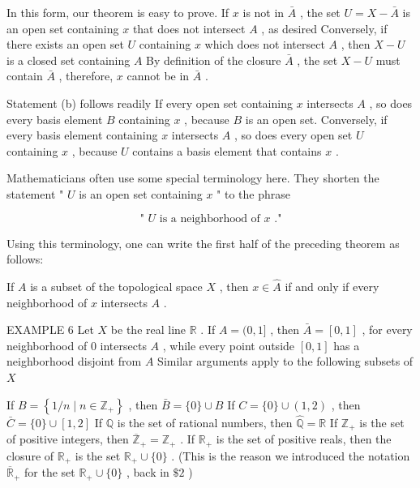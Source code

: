 In this form, our theorem is easy to prove. If \(x\) is not in \(\bar{A}\) , the set \(U = X - \bar{A}\) is an open set containing \(x\) that does not intersect \(A\) , as desired Conversely, if there exists an open set \(U\) containing \(x\) which does not intersect \(A\) , then \(X - U\) is a closed set containing \(A\) By definition of the closure \(\bar{A}\) , the set \(X - U\) must contain \(\bar{A}\) , therefore, \(x\) cannot be in \(\bar{A}\) .

Statement (b) follows readily If every open set containing \(x\) intersects \(A\) , so does every basis element \(B\) containing \(x\) , because \(B\) is an open set. Conversely, if every basis element containing \(x\) intersects \(A\) , so does every open set \(U\) containing \(x\) , because \(U\) contains a basis element that contains \(x\) .

Mathematicians often use some special terminology here. They shorten the statement " \(U\) is an open set containing \(x\) " to the phrase

\[
\text{ " }U\text{ is a neighborhood of }x\text{ ." }
\]

Using this terminology, one can write the first half of the preceding theorem as follows:

If \(A\) is a subset of the topological space \(X\) , then \(x \in  \widehat{A}\) if and only if every neighborhood of \(x\) intersects \(A\) .

EXAMPLE 6 Let \(X\) be the real line \(\mathbb{R}\) . If \(A = (0,1\rbrack\) , then \(\bar{A} = \left\lbrack  {0,1}\right\rbrack\) , for every neighborhood of 0 intersects \(A\) , while every point outside \(\left\lbrack  {0,1}\right\rbrack\) has a neighborhood disjoint from \(A\) Similar arguments apply to the following subsets of \(X\)

If \(B = \left\{  {1/n \mid  n \in  {\mathbb{Z}}_{ + }}\right\}\) , then \(\bar{B} = \{ 0\}  \cup  B\) If \(C = \{ 0\}  \cup  \left( {1,2}\right)\) , then \(\bar{C} = \{ 0\}  \cup  \left\lbrack  {1,2}\right\rbrack\) If \(\mathbb{Q}\) is the set of rational numbers, then \(\widehat{\mathbb{Q}} = \mathbb{R}\) If \({\mathbb{Z}}_{ + }\) is the set of positive integers, then \({\overline{\mathbb{Z}}}_{ + } = {\mathbb{Z}}_{ + }\) . If \({\mathbb{R}}_{ + }\) is the set of positive reals, then the closure of \({\mathbb{R}}_{ + }\) is the set \({\mathbb{R}}_{ + } \cup  \{ 0\}\) . (This is the reason we introduced the notation \({\overline{\mathbb{R}}}_{ + }\) for the set \({\mathbb{R}}_{ + } \cup  \{ 0\}\) , back in \(\$ 2\) )


